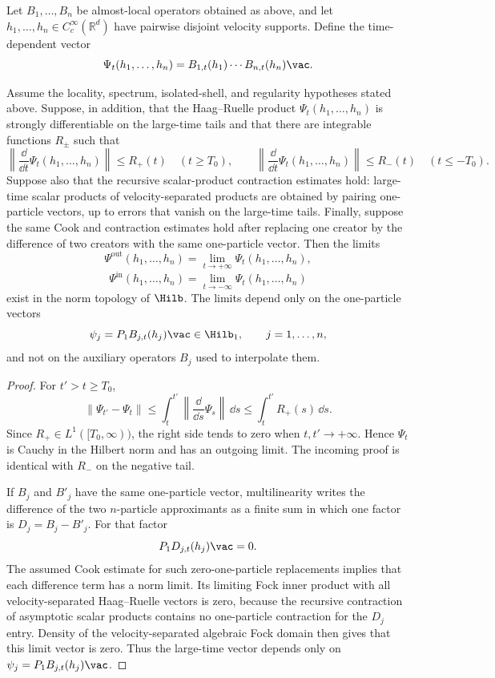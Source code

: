 Let \(B_1,\ldots,B_n\) be almost-local operators obtained as above, and let
\(h_1,\ldots,h_n\in C_c^\infty(\mathbb R^d)\) have pairwise disjoint velocity
supports. Define the time-dependent vector
\[
  \Psi_t(h_1,\ldots,h_n)
  =
  B_{1,t}(h_1)\cdots B_{n,t}(h_n)\vac .
\]

\begin{proposition}
\label{prop:haag-ruelle-cook-limits}
Assume the locality, spectrum, isolated-shell, and regularity hypotheses
stated above.  Suppose, in addition, that the Haag--Ruelle product
\(\Psi_t(h_1,\ldots,h_n)\) is strongly differentiable on the large-time tails
and that there are integrable functions \(R_\pm\) such that
\[
  \left\|\frac{\dd}{\dd t}\Psi_t(h_1,\ldots,h_n)\right\|
  \le R_+(t)\quad (t\ge T_0),
  \qquad
  \left\|\frac{\dd}{\dd t}\Psi_t(h_1,\ldots,h_n)\right\|
  \le R_-(t)\quad (t\le -T_0).
\]
Suppose also that the recursive scalar-product contraction estimates hold:
large-time scalar products of velocity-separated products are obtained by
pairing one-particle vectors, up to errors that vanish on the large-time
tails.  Finally, suppose the same Cook and contraction estimates hold after
replacing one creator by the difference of two creators with the same
one-particle vector.  Then the limits
\[
  \Psi^{\mathrm{out}}(h_1,\ldots,h_n)
  =
  \lim_{t\to+\infty}\Psi_t(h_1,\ldots,h_n),
\]
\[
  \Psi^{\mathrm{in}}(h_1,\ldots,h_n)
  =
  \lim_{t\to-\infty}\Psi_t(h_1,\ldots,h_n)
\]
exist in the norm topology of \(\Hilb\). The limits depend only on the
one-particle vectors
\[
  \psi_j=P_1B_{j,t}(h_j)\vac\in\Hilb_1,
  \qquad j=1,\ldots,n,
\]
and not on the auxiliary operators \(B_j\) used to interpolate them.
\end{proposition}

\begin{proof}
For \(t'>t\ge T_0\),
\[
  \|\Psi_{t'}-\Psi_t\|
  \le
  \int_t^{t'}
  \left\|\frac{\dd}{\dd s}\Psi_s\right\|\,\dd s
  \le
  \int_t^{t'}R_+(s)\,\dd s .
\]
Since \(R_+\in L^1([T_0,\infty))\), the right side tends to zero when
\(t,t'\to+\infty\).  Hence \(\Psi_t\) is Cauchy in the Hilbert norm and has
an outgoing limit.  The incoming proof is identical with \(R_-\) on the
negative tail.

If \(B_j\) and \(B'_j\) have the same one-particle vector, multilinearity
writes the difference of the two \(n\)-particle approximants as a finite sum
in which one factor is \(D_j=B_j-B'_j\).  For that factor
\[
  P_1D_{j,t}(h_j)\vac=0 .
\]
The assumed Cook estimate for such zero-one-particle replacements implies
that each difference term has a norm limit.  Its limiting Fock inner product
with all velocity-separated Haag--Ruelle vectors is zero, because the
recursive contraction of asymptotic scalar products contains no one-particle
contraction for the \(D_j\) entry.  Density of the velocity-separated
algebraic Fock domain then gives that this limit vector is zero.  Thus the
large-time vector depends only on \(\psi_j=P_1B_{j,t}(h_j)\vac\).
\end{proof}

